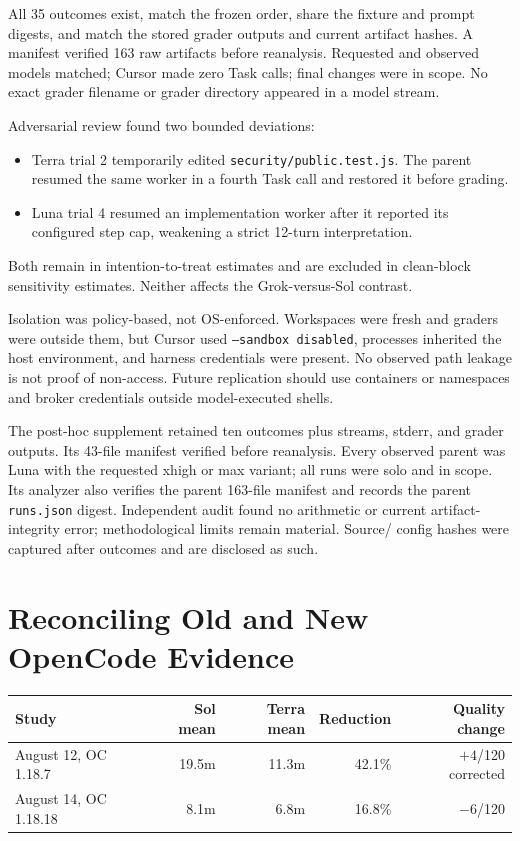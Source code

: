 \documentclass[11pt,oneside]{article}
\begin{document}
All 35 outcomes exist, match the frozen order, share the fixture and prompt
digests, and match the stored grader outputs and current artifact hashes. A
manifest verified 163 raw
artifacts before reanalysis. Requested and observed models matched; Cursor made
zero Task calls; final changes were in scope. No exact grader filename or grader
directory appeared in a model stream.

Adversarial review found two bounded deviations:

\begin{itemize}
  \item Terra trial 2 temporarily edited \texttt{security/public.test.js}. The
  parent resumed the same worker in a fourth Task call and restored it before
  grading.
  \item Luna trial 4 resumed an implementation worker after it reported its
  configured step cap, weakening a strict 12-turn interpretation.
\end{itemize}

Both remain in intention-to-treat estimates and are excluded in clean-block
sensitivity estimates. Neither affects the Grok-versus-Sol contrast.

Isolation was policy-based, not OS-enforced. Workspaces were fresh and graders
were outside them, but Cursor used \texttt{--sandbox disabled}, processes
inherited the host environment, and harness credentials were present. No
observed path leakage is not proof of non-access. Future replication should use
containers or namespaces and broker credentials outside model-executed shells.

The post-hoc supplement retained ten outcomes plus streams, stderr, and grader
outputs. Its 43-file manifest verified before reanalysis. Every observed parent
was Luna with the requested xhigh or max variant; all runs were solo and in
scope. Its analyzer also verifies the parent 163-file manifest and records the
parent \texttt{runs.json} digest. Independent audit found no arithmetic or
current artifact-integrity error; methodological limits remain material. Source/
config hashes were captured after outcomes and are disclosed as such.

\section{Reconciling Old and New OpenCode Evidence}

\begin{center}
\begin{tabular}{@{}lrrrr@{}}
\toprule
Study & Sol mean & Terra mean & Reduction & Quality change \\
\midrule
August 12, OC 1.18.7 & 19.5m & 11.3m & 42.1\% & $+4$/120 corrected \\
August 14, OC 1.18.18 & 8.1m & 6.8m & 16.8\% & $-6$/120 \\
\bottomrule
\end{tabular}
\end{center}
\end{document}
